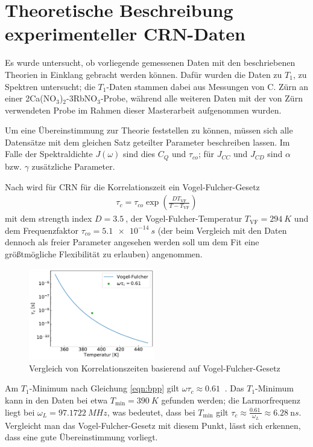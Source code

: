 \section{Theoretische Beschreibung experimenteller CRN-Daten} \label{section:theo:daten}


Es wurde untersucht, ob vorliegende gemessenen Daten mit den beschriebenen Theorien in Einklang gebracht werden können. Dafür wurden die Daten zu $T_1$, zu Spektren untersucht; die $T_1$-Daten stammen dabei aus Messungen von C. Zürn \cite{zuern_paper} an einer 2Ca(NO$_3$)$_2$-3RbNO$_3$-Probe, während alle weiteren Daten mit der von Zürn verwendeten Probe im Rahmen dieser Masterarbeit aufgenommen wurden.

Um eine Übereinstimmung zur Theorie feststellen zu können, müssen sich alle Datensätze mit dem gleichen Satz geteilter Parameter beschreiben lassen. Im Falle der Spektraldichte $J(\omega)$ sind dies $C_Q$ und $\tau_{co}$; für $J_{CC}$ und $J_{CD}$ sind $\alpha$ bzw. $\gamma$ zusätzliche Parameter.

Nach \cite{PIMENOV199793} wird für CRN für die Korrelationszeit ein Vogel-Fulcher-Gesetz
\begin{align}
	\tau_c = \tau_{co} \exp \left( \frac{D T_\text{VF}}{T-T_\text{VF}} \right) 
\end{align}
mit dem strength index $D = \SI{3.5}{}$, der Vogel-Fulcher-Temperatur $T_\text{VF} = \SI{294}{K}$ und dem Frequenzfaktor $\tau_{co} = \SI{5.1e-14}{s}$ (der beim Vergleich mit den Daten dennoch als freier Parameter angesehen werden soll um dem Fit eine größtmögliche Flexibilität zu erlauben) angenommen.

\begin{figure}
	\vspace{-20pt}
	\begin{center}
		\includegraphics[width=0.49\textwidth]{graphics/zwischenbericht/tau_c_arrhenius_vogel_fulcher.pdf}
	\end{center}
	\vspace{-20pt}
	\caption{Vergleich von Korrelationszeiten basierend auf Vogel-Fulcher-Gesetz \label{fig:korrelationszeiten}}
\end{figure}
Am $T_1$-Minimum nach Gleichung \eqref{eqn:bpp} gilt $\omega \tau_c \approx \SI{0.61}{}$ \cite[S. 629]{omegatau061}. Das $T_1$-Minimum kann in den Daten bei etwa $T_\text{min} = \SI{390}{K}$ gefunden werden; die Larmorfrequenz liegt bei $\omega_L = \SI{97.1722}{MHz}$, was bedeutet, dass bei $T_\text{min}$ gilt $\tau_c \approx \frac{\SI{0.61}{}}{\omega_L} \approx \SI{6.28}{\nano s}$. Vergleicht man das Vogel-Fulcher-Gesetz mit diesem Punkt, lässt sich erkennen, dass eine gute Übereinstimmung vorliegt.


